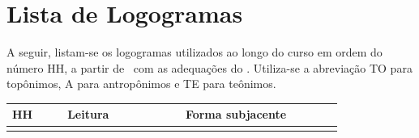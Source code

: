
\section{Lista de Logogramas}

A seguir, listam-se os logogramas utilizados ao longo do curso em ordem do
número HH, a partir de~\citet{LarocheHH} com as adequações do .
Utiliza-se a abreviação TO para topônimos, A para antropônimos e TE para teônimos.

{
\large
\begin{longtable}{p{0.06\linewidth}p{0.05\linewidth}p{0.3\linewidth}p{0.4\linewidth}}
	\toprule
	HH  &                          & Leitura                                   & Forma subjacente                  \\
	\midrule
	\endhead%

	\bottomrule
	\endfoot%


\end{longtable}}
